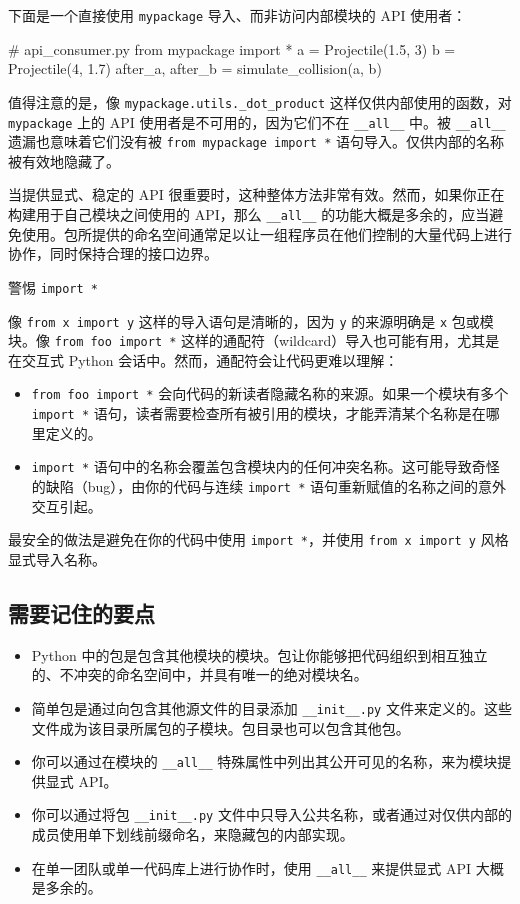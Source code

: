 下面是一个直接使用 \texttt{mypackage} 导入、而非访问内部模块的 API 使用者：

\begin{codebox}[python]
# api_consumer.py
from mypackage import *
a = Projectile(1.5, 3)
b = Projectile(4, 1.7)
after_a, after_b = simulate_collision(a, b)
\end{codebox}

值得注意的是，像 \texttt{mypackage.utils.\_dot\_product} 这样仅供内部使用的函数，对 \texttt{mypackage} 上的 API 使用者是不可用的，因为它们不在 \texttt{\_\_all\_\_} 中。被 \texttt{\_\_all\_\_} 遗漏也意味着它们没有被 \texttt{from mypackage import *} 语句导入。仅供内部的名称被有效地隐藏了。

当提供显式、稳定的 API 很重要时，这种整体方法非常有效。然而，如果你正在构建用于自己模块之间使用的 API，那么 \texttt{\_\_all\_\_} 的功能大概是多余的，应当避免使用。包所提供的命名空间通常足以让一组程序员在他们控制的大量代码上进行协作，同时保持合理的接口边界。

警惕 \texttt{import *}

像 \texttt{from x import y} 这样的导入语句是清晰的，因为 \texttt{y} 的来源明确是 \texttt{x} 包或模块。像 \texttt{from foo import *} 这样的通配符（wildcard）导入也可能有用，尤其是在交互式 Python 会话中。然而，通配符会让代码更难以理解：

\begin{itemize}
\item \texttt{from foo import *} 会向代码的新读者隐藏名称的来源。如果一个模块有多个 \texttt{import *} 语句，读者需要检查所有被引用的模块，才能弄清某个名称是在哪里定义的。
\item \texttt{import *} 语句中的名称会覆盖包含模块内的任何冲突名称。这可能导致奇怪的缺陷（bug），由你的代码与连续 \texttt{import *} 语句重新赋值的名称之间的意外交互引起。
\end{itemize}

最安全的做法是避免在你的代码中使用 \texttt{import *}，并使用 \texttt{from x import y} 风格显式导入名称。

\subsection{需要记住的要点}

\begin{itemize}
\item Python 中的包是包含其他模块的模块。包让你能够把代码组织到相互独立的、不冲突的命名空间中，并具有唯一的绝对模块名。
\item 简单包是通过向包含其他源文件的目录添加 \texttt{\_\_init\_\_.py} 文件来定义的。这些文件成为该目录所属包的子模块。包目录也可以包含其他包。
\item 你可以通过在模块的 \texttt{\_\_all\_\_} 特殊属性中列出其公开可见的名称，来为模块提供显式 API。
\item 你可以通过将包 \texttt{\_\_init\_\_.py} 文件中只导入公共名称，或者通过对仅供内部的成员使用单下划线前缀命名，来隐藏包的内部实现。
\item 在单一团队或单一代码库上进行协作时，使用 \texttt{\_\_all\_\_} 来提供显式 API 大概是多余的。
\end{itemize}

